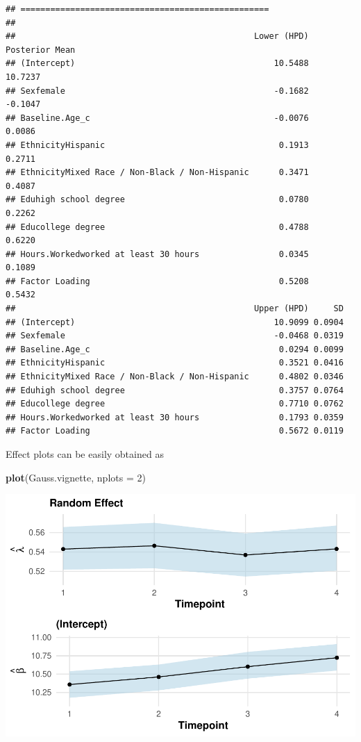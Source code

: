 \documentclass[a4paper, preprint, 3p,
authoryear]{elsarticle} %
\newenvironment{Shaded}{\begin{snugshade}}{\end{snugshade}}
\newcommand{\AttributeTok}[1]{\textcolor[rgb]{0.13,0.29,0.53}{#1}}
\newcommand{\DecValTok}[1]{\textcolor[rgb]{0.00,0.00,0.81}{#1}}
\newcommand{\FunctionTok}[1]{\textcolor[rgb]{0.13,0.29,0.53}{\textbf{#1}}}
\newcommand{\NormalTok}[1]{#1}
\begin{document}
\begin{verbatim}
## ==================================================
## 
##                                                Lower (HPD) Posterior Mean
## (Intercept)                                        10.5488        10.7237
## Sexfemale                                          -0.1682        -0.1047
## Baseline.Age_c                                     -0.0076         0.0086
## EthnicityHispanic                                   0.1913         0.2711
## EthnicityMixed Race / Non-Black / Non-Hispanic      0.3471         0.4087
## Eduhigh school degree                               0.0780         0.2262
## Educollege degree                                   0.4788         0.6220
## Hours.Workedworked at least 30 hours                0.0345         0.1089
## Factor Loading                                      0.5208         0.5432
##                                                Upper (HPD)     SD
## (Intercept)                                        10.9099 0.0904
## Sexfemale                                          -0.0468 0.0319
## Baseline.Age_c                                      0.0294 0.0099
## EthnicityHispanic                                   0.3521 0.0416
## EthnicityMixed Race / Non-Black / Non-Hispanic      0.4802 0.0346
## Eduhigh school degree                               0.3757 0.0764
## Educollege degree                                   0.7710 0.0762
## Hours.Workedworked at least 30 hours                0.1793 0.0359
## Factor Loading                                      0.5672 0.0119
\end{verbatim}

Effect plots can be easily obtained as

\begin{Shaded}
\begin{Highlighting}[]
\FunctionTok{plot}\NormalTok{(Gauss.vignette, }\AttributeTok{nplots =} \DecValTok{2}\NormalTok{)}
\end{Highlighting}
\end{Shaded}

\includegraphics[width=0.7\linewidth]{Vignette-for-panelTVP_files/figure-latex/myplot-1}
\end{document}
